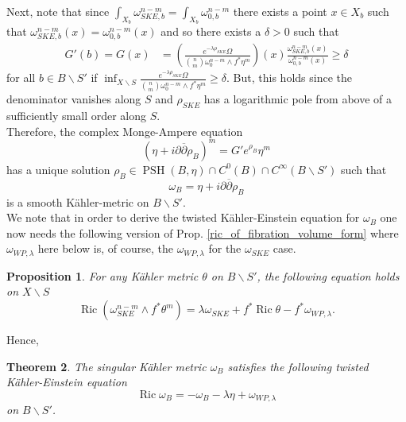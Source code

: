 \documentclass[12pt]{article}
\newtheorem{theorem}{Theorem}[section]
\newtheorem{proposition}[theorem]{Proposition}
\numberwithin{equation}{section}
\renewcommand{\d}{\partial}
\newcommand{\dbar}{\overline{\partial}}
\DeclareMathOperator{\Ric}{Ric}
\DeclareMathOperator{\PSH}{PSH}
\begin{document}
Next, note that since $\int_{X_b} \omega_{SKE,b}^{n-m} = \int_{X_b} \omega_{0,b}^{n-m}$ there exists a point $x \in X_b$ such that $\omega_{SKE,b}^{n-m}(x) = \omega_{0,b}^{n-m}(x)$ and so there exists a $\delta > 0$ such that
\begin{align*}
    G'(b) = G(x) &= \left(\frac{e^{-\lambda \rho_{SKE}}\Omega}{{n \choose m} \omega_{0}^{n-m} \wedge f^* \eta^m}\right)(x) \frac{\omega_{SKE,b}^{n-m}(x)}{\omega_{0,b}^{n-m}(x)} \geq \delta
\end{align*}
for all $b \in B \backslash S'$ if $\inf_{X\backslash S} \frac{e^{-\lambda \rho_{SKE}}\Omega}{{n \choose m} \omega_0^{n-m} \wedge f^* \eta^m} \geq \delta$. But, this holds since the denominator vanishes along $S$ and $\rho_{SKE}$ has a logarithmic pole from above of a sufficiently small order along $S$.\\ 
Therefore, the complex Monge-Ampere equation
\begin{equation*}
    (\eta + i\d\dbar \rho_B)^m = G' e^{\rho_B} \eta^m
\end{equation*}
has a unique solution $\rho_B \in \PSH(B,\eta) \cap C^0(B) \cap C^{\infty}(B\backslash S')$ such that
\begin{equation*}
    \omega_B = \eta + i\d\dbar \rho_B
\end{equation*}
is a smooth K\"ahler-metric on $B\backslash S'$.\\
We note that in order to derive the twisted K\"ahler-Einstein equation for $\omega_B$ one now needs the following version of Prop. \ref{ric_of_fibration_volume_form} where $\omega_{WP,\lambda}$ here below is, of course, the $\omega_{WP,\lambda}$ for the $\omega_{SKE}$ case.

\begin{proposition}
For any K\"ahler metric $\theta $ on $B\backslash S'$, the following equation holds on $X \backslash S$
\begin{equation*}
    \Ric(\omega_{SKE}^{n-m}\wedge f^*\theta^m) = \lambda \omega_{SKE} + f^*\Ric \theta - f^*\omega_{WP,\lambda}.
\end{equation*}
\end{proposition}

\noindent Hence,
\begin{theorem}
The singular K\"ahler metric $\omega_B$ satisfies the following twisted K\"ahler-Einstein equation
\begin{equation*}
    \Ric \omega_B = -\omega_B - \lambda \eta + \omega_{WP,\lambda}
\end{equation*}
on $B \backslash S'$.
\end{theorem}
\end{document}
